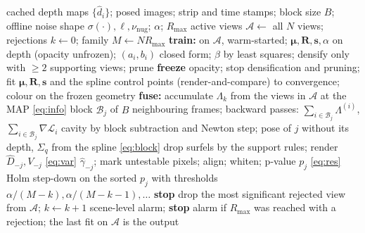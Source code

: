 \begin{algorithm}[t]
\caption{Train, freeze, fuse, test (outer loop)}
\label{alg:gate}
\begin{algorithmic}[1]
\REQUIRE cached depth maps $\{\hat d_i\}$; posed images; strip and time stamps; block size $B$; offline noise shape $\sigma(\cdot),\ell,\nu_{\mathrm{nug}}$; $\alpha$; $R_{\max}$
\STATE active views $\mathcal{A}\gets$ all $N$ views; rejections $k\gets0$; family $M\gets NR_{\max}$
  \STATE \textbf{train:} on $\mathcal{A}$, warm-started; $\boldsymbol\mu,\mathbf{R},\mathbf{s},\alpha$ on depth (opacity unfrozen); $(a_i,b_i)$ closed form; $\beta$ by least squares; densify only with $\ge2$ supporting views; prune
  \STATE \textbf{freeze} opacity; stop densification and pruning; fit $\boldsymbol\mu,\mathbf{R},\mathbf{s}$ and the spline control points (render-and-compare) to convergence; colour on the frozen geometry
  \STATE \textbf{fuse:} accumulate $\Lambda_k$ from the views in $\mathcal{A}$ at the MAP \hfill \eqref{eq:info}
    \STATE block $\mathcal{B}_j$ of $B$ neighbouring frames; backward passes: $\sum_{i\in\mathcal{B}_j}\Lambda^{(i)}$, $\sum_{i\in\mathcal{B}_j}\nabla\mathcal{L}_i$
    \STATE cavity by block subtraction and Newton step; pose of $j$ without its depth, $\Sigma_q$ from the spline \hfill \eqref{eq:block}
    \STATE drop surfels by the support rules; render $\hat D_{-j},V_{-j}$ \hfill \eqref{eq:var}
    \STATE $\hat\gamma_{-j}$; mark untestable pixels; align; whiten; p-value $p_j$ \hfill \eqref{eq:res}
  \ENDFOR
  \STATE Holm step-down on the sorted $p_j$ with thresholds $\alpha/(M-k),\alpha/(M-k-1),\dots$
    \STATE \textbf{stop}
  \ENDIF
  \STATE drop the most significant rejected view from $\mathcal{A}$; $k\gets k+1$
    \STATE scene-level alarm; \textbf{stop}
  \ENDIF
\ENDFOR
\STATE alarm if $R_{\max}$ was reached with a rejection; the last fit on $\mathcal{A}$ is the output
\end{algorithmic}
\end{algorithm}
